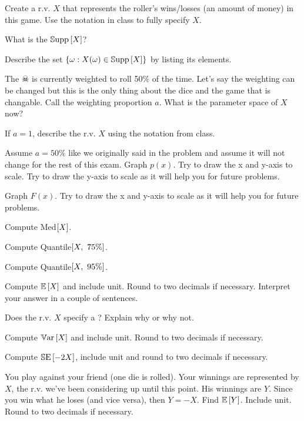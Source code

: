 \documentclass[12pt]{article}
\begin{document}
\benum

 Create a r.v. $X$ that represents the roller's wins/losses (an amount of money) in this game. Use the notation in class to fully specify $X$. 

 What is the $\mathbb{S}\text{upp}\left[X\right]$? 

 Describe the set $\left\{\omega : X(\omega) \in \mathbb{S}\text{upp}\left[X\right]\right\}$ by listing its elements. 

 The $\skull$ is currently weighted to roll 50\% of the time. Let's say the weighting can be changed but this is the only thing about the dice and the game that is changable. Call the weighting proportion $a$. What is the parameter space of $X$ now?  

 If $a=1$, describe the r.v. $X$ using the notation from class.  


 Assume $a=50\%$ like we originally said in the problem and assume it will not change for the rest of this exam. Graph $p(x)$. Try to draw the x and y-axis to scale. Try to draw the y-axis to scale as it will help you for future problems. 

 Graph $F(x)$. Try to draw the x and y-axis to scale as it will help you for future problems. 

 Compute Med$\left[X\right]$. 

 Compute Quantile$\left[X,~75\%\right]$. 

 Compute Quantile$\left[X,~95\%\right]$. 

 Compute $\mathbb{E}\left[X\right]$ and include unit. Round to two decimals if necessary. Interpret your answer in a couple of sentences. 

 Does the r.v. $X$ specify a ? Explain why or why not. 

 Compute $\mathbb{V}\text{ar}\left[X\right]$ and include unit. Round to two decimals if necessary. 

 Compute $\mathbb{S}\text{E}\left[-2X\right]$, include unit and round to two decimals if necessary.  

 You play against your friend (one die is rolled). Your winnings are represented by $X$, the r.v. we've been considering up until this point. His winnings are $Y$. Since you win what he loses (and vice versa), then $Y = -X$. Find $\mathbb{E}\left[Y\right]$. Include unit. Round to two decimals if necessary.
\end{document}
